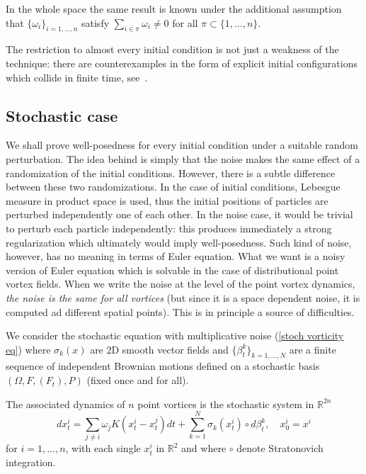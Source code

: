 \documentclass[11pt,a4paper]{article}%
\begin{document}
In the whole space the same result is known under the additional assumption that $\{
\omega_{i}\} _{i=1,...,n}$ satisfy $\sum_{i\in\pi}\omega_{i}\neq0$ for all
$\pi\subset\{ 1,...,n\} $.

The restriction to almost every initial condition is not just a weakness of
the technique:  there are counterexamples in the form of explicit initial configurations which
collide in finite time, see~\cite{March Pulv}.


\subsection{Stochastic case}

We shall prove well-posedness for every initial condition under a
suitable random perturbation. The idea behind is simply that the
noise makes the same effect of a randomization of the initial
conditions. However, there is a subtle difference between these two
randomizations. In the case of initial conditions, Lebesgue measure
in product space is used, thus the initial positions of particles
are perturbed independently one of each other. In the noise case, it
would be trivial to perturb each particle independently: this
produces immediately a strong regularization which ultimately would
imply well-posedness. Such kind of noise, however, has no meaning in
terms of Euler equation. What we want is a noisy version of Euler
equation which is solvable in the case of distributional point
vortex fields. When we write the noise at the level of the point
vortex dynamics, \emph{the noise is the same for all vortices} (but
since it is a space dependent noise, it is computed ad different
spatial points). This is in principle  a  source of difficulties.


\vskip 1mm We consider the stochastic equation with multiplicative
noise (\ref{stoch vorticity eq}) where $\sigma_{k}( x) $ are 2D
smooth vector fields and $\{ \beta^{k}_t\} _{k=1,...,N}$  are a
finite sequence  of independent Brownian motions defined  on a
stochastic basis $( \Omega,F,( F_{t}) ,P) $ (fixed once and for
all).

The associated dynamics
of $n$ point vortices is the stochastic system in $\mathbb{R}^{2n}$
\begin{equation}
dx_{t}^{i}=\sum_{j\neq i}\omega_{j}K( x_{t}^{i}-x_{t}^{j}) dt+\sum_{k=1}%
^{N}\sigma_{k}( x_{t}^{i}) \circ d\beta_{t}^{k},\quad x_{0}^{i}=x^{i} \label{SDE}%
\end{equation}
for $i=1,...,n$, with each single $x_{t}^{i}$ in $\mathbb{R}^{2}$ and where $\circ$ denote Stratonovich integration.
\end{document}
